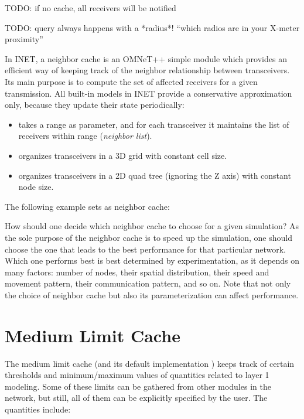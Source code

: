 TODO: if no cache, all receivers will be notified

TODO: query always happens with a *radius*!  ``which radios are in your  X-meter proximity''

In INET, a neighbor cache is an OMNeT++ simple module which provides
an efficient way of keeping track of the neighbor relationship between
transceivers. Its main purpose is to compute the set of affected receivers
for a given transmission. All built-in models in INET provide a
conservative approximation only, because they update their state
periodically:

\begin{itemize}
  \item {} takes a range as parameter,
    and for each transceiver it maintains the list of receivers within
    range (\textit{neighbor list}).
  \item {} organizes transceivers in a 3D grid with 
    constant cell size.
  \item {} organizes transceivers in a 2D quad tree
    (ignoring the Z axis) with constant node size.
\end{itemize}

The following example sets  as neighbor cache:


How should one decide which neighbor cache to choose for a given simulation? 
As the sole purpose of the neighbor cache is to speed up the simulation, 
one should choose the one that leads to the best performance for that particular
network. Which one performs best is best determined by experimentation, as it
depends on many factors: number of nodes, their spatial distribution, their
speed and movement pattern, their communication pattern, and so on. 
Note that not only the choice of neighbor cache but also its parameterization
can affect performance.


\section{Medium Limit Cache}

The medium limit cache (and its default implementation )
keeps track of certain thresholds and minimum/maximum values of quantities 
related to layer 1 modeling. Some of these limits can be gathered from other 
modules in the network, but still, all of them can be explicitly specified by the user. 
The quantities include:

